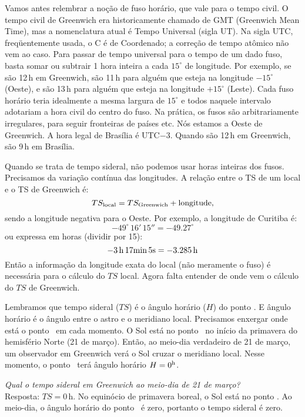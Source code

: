Vamos antes relembrar a noção de fuso horário, que vale para o tempo civil. O tempo civil de Greenwich era historicamente chamado de GMT (Greenwich Mean Time), mas a nomenclatura atual é Tempo Universal (sigla UT). Na sigla UTC, freqüentemente usada, o C é de Coordenado; a correção de tempo atômico não vem ao caso. Para passar de tempo universal para o tempo de um dado fuso, basta somar ou subtrair 1 hora inteira a cada $15^{\circ}$ de longitude. Por exemplo, se são 12\,h em Greenwich, são 11\,h para alguém que esteja na longitude $-15^{\circ}$ (Oeste), e são 13\,h para alguém que esteja na longitude $+15^{\circ}$ (Leste). Cada fuso horário teria idealmente a mesma largura de $15^{\circ}$ e todos naquele intervalo adotariam a hora civil do centro do fuso. Na prática, os fusos são arbitrariamente irregulares, para seguir fronteiras de países etc. Nós estamos a Oeste de Greenwich. A hora legal de Brasília é UTC$-3$. Quando são 12\,h em Greenwich, são 9\,h em Brasília.

Quando se trata de tempo sideral, não podemos usar horas inteiras dos fusos. Precisamos da variação contínua das longitudes. A relação entre o TS de um local e o TS de Greenwich é:
%
\begin{equation}\label{TSlocal}
TS_{\rm local} = TS_{\rm Greenwich} + \text{longitude},
\end{equation}
%
sendo a longitude negativa para o Oeste. Por exemplo, a longitude de Curitiba é:
%
\[
-49^{\circ} \, 16' \, 15'' = -49.27^{\circ}
\]
ou expressa em horas (dividir por 15):
\[
-3\,{\rm h}\,17{\rm min}\,5{\rm s} = -3.285\,{\rm h}
\]
%
Então a informação da longitude exata do local (não meramente o fuso) é necessária para o cálculo do $TS$ local. Agora falta entender de onde vem o cálculo do $TS$ de Greenwich.

Lembramos que tempo sideral ($TS$) é o ângulo horário ($H$) do ponto \Aries. E ângulo horário é o ângulo entre o astro e o meridiano local. Precisamos enxergar onde está o ponto \Aries\ em cada momento. O Sol está no ponto \Aries\ no início da primavera do hemisfério Norte (21 de março). Então, ao meio-dia verdadeiro de 21 de março, um observador em Greenwich verá o Sol cruzar o meridiano local. Nesse momento, o ponto \Aries\ terá ângulo horário $H=0^{\rm h}$.

\begin{exemplo}{0}
\textit{Qual o tempo sideral em Greenwich ao meio-dia de 21 de março?}\\

Resposta: $TS = 0$\,h. No equinócio de primavera boreal, o Sol está no ponto \Aries. Ao meio-dia, o ângulo horário do ponto \Aries\ é zero, portanto o tempo sideral é zero.
\end{exemplo}

